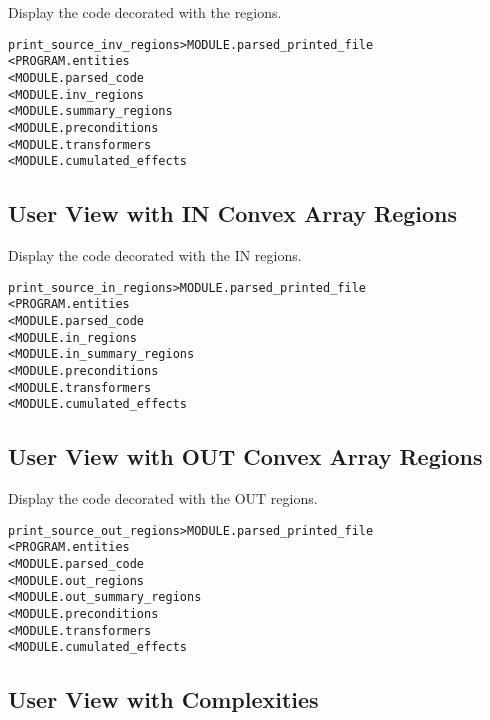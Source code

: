 \documentclass[a4paper]{report}
\newenvironment{PipsMake}{\begin{alltt}}{\end{alltt}}
\newenvironment{PipsPass}[1]{\label{pass:#1}}{}
\begin{document}
\begin{PipsPass}{print_source_inv_regions}
Display the code decorated with the regions.
\end{PipsPass}

\begin{PipsMake}
print_source_inv_regions              > MODULE.parsed_printed_file
        < PROGRAM.entities
        < MODULE.parsed_code
        < MODULE.inv_regions
        < MODULE.summary_regions
        < MODULE.preconditions
        < MODULE.transformers
        < MODULE.cumulated_effects
\end{PipsMake}


\subsection{User View with IN Convex Array Regions}

\begin{PipsPass}{print_source_in_regions}
Display the code decorated with the IN regions.
\end{PipsPass}

\begin{PipsMake}
print_source_in_regions              > MODULE.parsed_printed_file
        < PROGRAM.entities
        < MODULE.parsed_code
        < MODULE.in_regions
        < MODULE.in_summary_regions
        < MODULE.preconditions
        < MODULE.transformers
        < MODULE.cumulated_effects
\end{PipsMake}

\subsection{User View with OUT Convex Array Regions}

\begin{PipsPass}{print_source_out_regions}
Display the code decorated with the OUT regions.
\end{PipsPass}

\begin{PipsMake}
print_source_out_regions              > MODULE.parsed_printed_file
        < PROGRAM.entities
        < MODULE.parsed_code
        < MODULE.out_regions
        < MODULE.out_summary_regions
        < MODULE.preconditions
        < MODULE.transformers
        < MODULE.cumulated_effects
\end{PipsMake}


\subsection{User View with Complexities}
\end{document}
